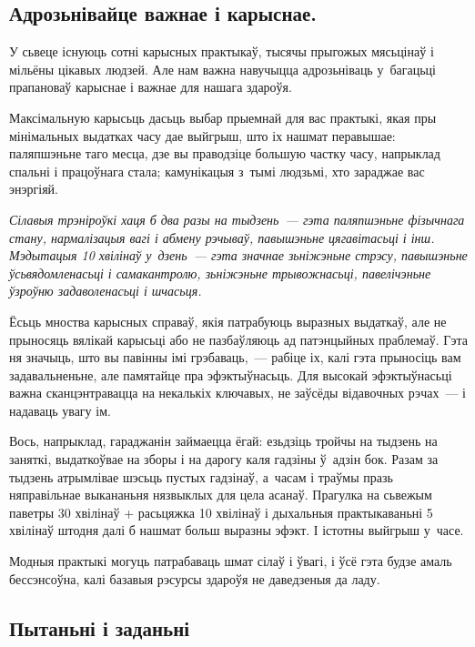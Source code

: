 \subsection*{Адрозьнівайце важнае і карыснае.}

У сьвеце існуюць сотні карысных практыкаў, тысячы прыгожых мясьцінаў і мільёны цікавых людзей. Але нам важна навучыцца адрозьніваць у~багацьці прапановаў карыснае і важнае для нашага здароўя. 


Максімальную карысьць дасьць выбар прыемнай для вас практыкі, якая пры мінімальных выдатках часу дае выйгрыш, што іх нашмат перавышае: паляпшэньне таго месца, дзе вы праводзіце большую частку часу, напрыклад спальні і працоўнага стала; камунікацыя з~тымі людзьмі, хто зараджае вас энэргіяй.

\emph{Сілавыя трэніроўкі хаця б два разы на тыдзень~--- гэта паляпшэньне фізычнага стану, нармалізацыя вагі і абмену рэчываў, павышэньне цягавітасьці і інш. Мэдытацыя 10 хвілінаў у~дзень~--- гэта значнае зьніжэньне стрэсу, павышэньне ўсьвядомленасьці і самакантролю, зьніжэньне трывожнасьці, павелічэньне ўзроўню задаволенасьці і шчасьця.}

Ёсьць мноства карысных справаў, якія патрабуюць выразных выдаткаў, але не прыносяць вялікай карысьці або не пазбаўляюць ад патэнцыйных праблемаў. Гэта ня значыць, што вы павінны імі грэбаваць,~--- рабіце іх, калі гэта прыносіць вам задавальненьне, але памятайце пра эфэктыўнасьць. Для высокай эфэктыўнасьці важна сканцэнтравацца на некалькіх ключавых, не заўсёды відавочных рэчах~--- і надаваць увагу ім.

Вось, напрыклад, гараджанін займаецца ёгай: езьдзіць тройчы на тыдзень на заняткі, выдаткоўвае на зборы і на дарогу каля гадзіны ў~адзін бок. Разам за тыдзень атрымлівае шэсьць пустых гадзінаў, а~часам і траўмы празь няправільнае выкананьня нязвыклых для цела асанаў. Прагулка на сьвежым паветры 30 хвілінаў + расьцяжка 10 хвілінаў і дыхальныя практыкаваньні 5 хвілінаў штодня далі б нашмат больш выразны эфэкт. І істотны выйгрыш у~часе.

Модныя практыкі могуць патрабаваць шмат сілаў і ўвагі, і ўсё гэта будзе амаль бессэнсоўна, калі базавыя рэсурсы здароўя не даведзеныя да ладу.

\subsection*{Пытаньні і заданьні}

